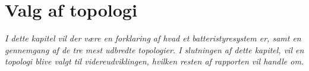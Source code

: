 \chapter{Valg af topologi}\label{kap:topologi}

\emph{I dette kapitel vil der være en forklaring af hvad et batteristyresystem er, samt en gennemgang af de tre mest udbredte topologier. I slutningen af dette kapitel, vil en topologi blive valgt til videreudviklingen, hvilken resten af rapporten vil handle om.}